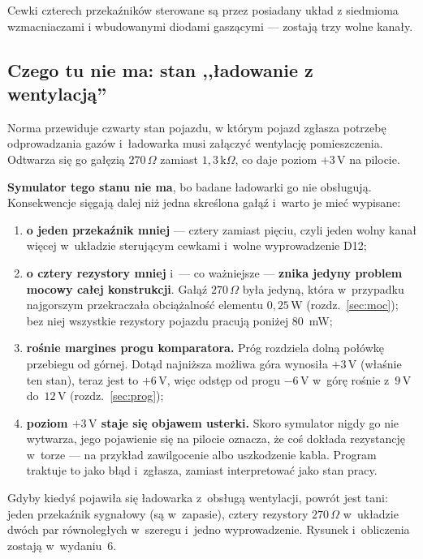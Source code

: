 \documentclass[a4paper,11pt]{article}
\newcommand{\ohm}{\,\Omega}
\newcommand{\kohm}{\,\mathrm{k}\Omega}
\newcommand{\volt}{\,\mathrm{V}}
\newcommand{\watt}{\,\mathrm{W}}
\begin{document}
Cewki czterech przekaźników sterowane są przez posiadany układ z siedmioma
wzmacniaczami i wbudowanymi diodami gaszącymi --- zostają trzy wolne kanały.

\subsection{Czego tu nie ma: stan ,,ładowanie z wentylacją''}
\label{sec:bezD}

Norma przewiduje czwarty stan pojazdu, w którym pojazd zgłasza potrzebę odprowadzania
gazów i~ładowarka musi załączyć wentylację pomieszczenia. Odtwarza się go gałęzią
$270\ohm$ zamiast $1{,}3\kohm$, co daje poziom $+3\volt$ na pilocie.

\textbf{Symulator tego stanu nie ma}, bo badane ładowarki go nie obsługują. Konsekwencje
sięgają dalej niż jedna skreślona gałąź i~warto je mieć wypisane:

\begin{enumerate}
\item \textbf{o jeden przekaźnik mniej} --- cztery zamiast pięciu, czyli jeden wolny
      kanał więcej w~układzie sterującym cewkami i~wolne wyprowadzenie D12;
\item \textbf{o cztery rezystory mniej} i~--- co ważniejsze --- \textbf{znika jedyny
      problem mocowy całej konstrukcji}. Gałąź $270\ohm$ była jedyną, która w~przypadku
      najgorszym przekraczała obciążalność elementu $0{,}25\watt$
      (rozdz.~\ref{sec:moc}); bez niej wszystkie rezystory pojazdu pracują poniżej
      $80$~mW;
\item \textbf{rośnie margines progu komparatora.} Próg rozdziela dolną połówkę
      przebiegu od górnej. Dotąd najniższa możliwa góra wynosiła $+3\volt$ (właśnie
      ten stan), teraz jest to $+6\volt$, więc odstęp od progu $-6\volt$ w~górę rośnie
      z~$9\volt$ do~$12\volt$ (rozdz.~\ref{sec:prog});
\item \textbf{poziom $+3\volt$ staje się objawem usterki.} Skoro symulator nigdy go nie
      wytwarza, jego pojawienie się na pilocie oznacza, że coś dokłada rezystancję
      w~torze --- na przykład zawilgocenie albo uszkodzenie kabla. Program traktuje to
      jako błąd i~zgłasza, zamiast interpretować jako stan pracy.
\end{enumerate}

Gdyby kiedyś pojawiła się ładowarka z~obsługą wentylacji, powrót jest tani: jeden
przekaźnik sygnałowy (są w~zapasie), cztery rezystory $270\ohm$ w~układzie dwóch par
równoległych w~szeregu i~jedno wyprowadzenie. Rysunek i~obliczenia zostają w~wydaniu~6.
\end{document}
